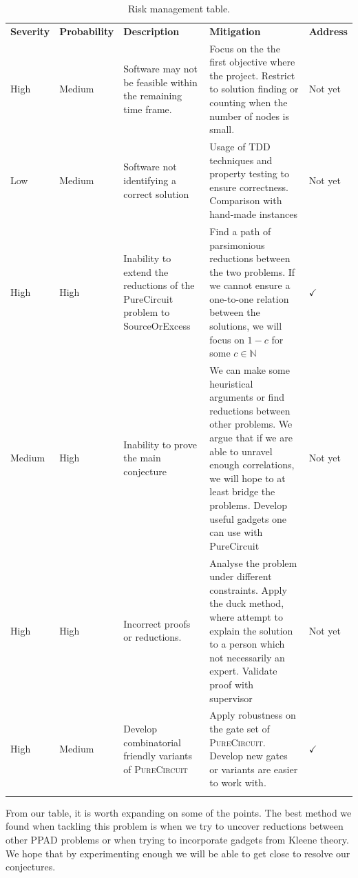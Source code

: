\begin{xltabular}{0.95\linewidth}{|Z{1.2cm}|Z{1.75cm}|Y|Y|Z{1.2cm}|}
        \hline
        \textbf{Severity} & \textbf{Probability} & \textbf{Description} & \textbf{Mitigation} & \textbf{Address} \\
        \hhline{|=|=|=|=|=|}
        High   & Medium & Software may not be feasible within the remaining time frame. & Focus on the the first objective where the project. Restrict to solution finding or counting when the number of nodes is small. & Not yet      \\ \hline
        Low    & Medium & Software not identifying a correct solution & Usage of TDD techniques and property testing to ensure correctness.  Comparison with hand-made instances & Not yet      \\ \hline
        High   & High   & Inability to extend the reductions of the PureCircuit problem to SourceOrExcess & Find a path of parsimonious reductions between the two problems. If we cannot ensure a one-to-one relation between the solutions, we will focus on $1-c$ for some $c \in \mathbb{N}$  & $\checkmark$ \\ \hline
        Medium & High   & Inability to prove the main conjecture & We can make some heuristical arguments or find reductions between other problems. We argue that if we are able to unravel enough correlations, we will hope to at least bridge the problems. Develop useful gadgets one can use with PureCircuit & Not yet     \\ \hline
        High   & High   & Incorrect proofs or reductions. & Analyse the problem under different constraints. Apply the duck method, where attempt to explain the solution to a person which not necessarily an expert. Validate proof with supervisor & Not yet  \\ \hline
        High   & Medium & Develop combinatorial friendly variants of \textsc{PureCircuit} & Apply robustness on the gate set of \textsc{PureCircuit}. Develop new gates or variants are easier to work with.  & $\checkmark$  \\ \hline
        \caption{Risk management table.} \label{tab:management:risk-management}
\end{xltabular}


From our table, it is worth expanding on some of the points. The best method
we found when tackling this problem is when we try to uncover reductions between other
\textsc{PPAD} problems or when trying to incorporate gadgets from Kleene theory. We hope
that by experimenting enough we will be able to get close to resolve our conjectures.

